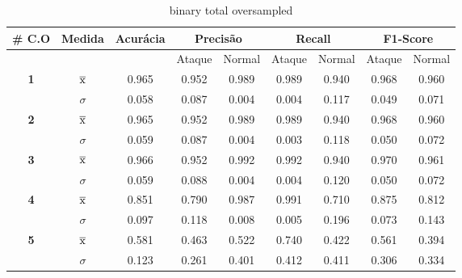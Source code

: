 \begin{table}[htb]
    \centering
    \begin{tabular}{c|c|c|cc|cc|cc}
        \hline
        \# \textbf{C.O} & \textbf{Medida} & \textbf{Acurácia} & \multicolumn{2}{c|}{ \textbf{Precisão} } & \multicolumn{2}{c|}{ \textbf{Recall} } & \multicolumn{2}{c}{ \textbf{F1-Score} } \\
        \hline
        & & & Ataque & Normal & Ataque & Normal & Ataque & Normal \\
        \hline
        \multirow{2}{*}{ \textbf{1} } & $ \overline{\rm x} $ & 0.965 & 0.952 & 0.989 & 0.989 & 0.940 & 0.968 & 0.960 \\
        & $\sigma$ & 0.058 & 0.087 & 0.004 & 0.004 & 0.117 & 0.049 & 0.071 \\
        \hline
        \multirow{2}{*}{ \textbf{2} } & $ \overline{\rm x} $ & 0.965 & 0.952 & 0.989 & 0.989 & 0.940 & 0.968 & 0.960 \\
        & $\sigma$ & 0.059 & 0.087 & 0.004 & 0.003 & 0.118 & 0.050 & 0.072 \\
        \hline
        \multirow{2}{*}{ \textbf{3} } & $ \overline{\rm x} $ & 0.966 & 0.952 & 0.992 & 0.992 & 0.940 & 0.970 & 0.961 \\
        & $\sigma$ & 0.059 & 0.088 & 0.004 & 0.004 & 0.120 & 0.050 & 0.072 \\
        \hline
        \multirow{2}{*}{ \textbf{4} } & $ \overline{\rm x} $ & 0.851 & 0.790 & 0.987 & 0.991 & 0.710 & 0.875 & 0.812 \\
        & $\sigma$ & 0.097 & 0.118 & 0.008 & 0.005 & 0.196 & 0.073 & 0.143 \\
        \hline
        \multirow{2}{*}{ \textbf{5} } & $ \overline{\rm x} $ & 0.581 & 0.463 & 0.522 & 0.740 & 0.422 & 0.561 & 0.394 \\
        & $\sigma$ & 0.123 & 0.261 & 0.401 & 0.412 & 0.411 & 0.306 & 0.334 \\
        \hline
    \end{tabular}
    \caption{binary total oversampled}
\end{table}

